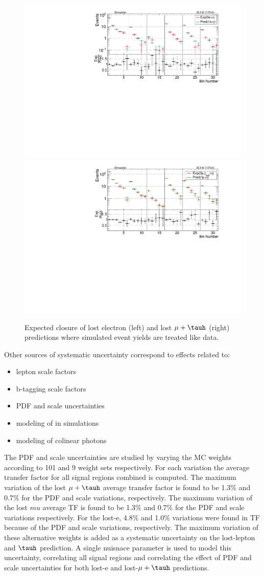 \begin{figure}
\centering
\includegraphics[width=0.48\linewidth]{../Figures/Chap3/SUSY_Photon_MET_JbJ_18Aug17/LostEle_Closure/AllSBins_v7_Ele0AllSBins_v7_Ele1.pdf}
\includegraphics[width=0.48\linewidth]{../Figures/Chap3/SUSY_Photon_MET_JbJ_18Aug17/LostMu_Closure/AllSBins_v7_Mu0AllSBins_v7_Mu1.pdf}
\captionsetup{width=.9\linewidth}
\caption[Closure for lost lepton and \tauh]{Expected closure of lost electron (left) and lost $\mu+\tauh$ (right) predictions
where simulated event yields are treated like data.}
\label{fig:lost_lepton_closure}
\end{figure}

Other sources of systematic uncertainty correspond to effects related to:
\begin{itemize}
  \item lepton scale factors
  \item b-tagging scale factors
  \item PDF and scale uncertainties
  \item modeling of \mt in simulations
  \item modeling of colinear photons 
\end{itemize}

The PDF and scale uncertainties are studied by varying the MC weights according
to 101 and 9 weight sets respectively.  For each variation the average transfer factor for
all signal regions combined is computed.  
The maximum variation of the lost $\mu+\tauh$
average transfer factor is found to be 1.3\% and 0.7\% for the PDF and scale variations, 
respectively.  
The maximum variation of the lost $mu$ average TF is found to be 1.3\% and 0.7\% for the PDF and scale variations respectively.
For the lost-e, 4.8\% and 1.0\% variations were found in TF because of the PDF and scale variations, respectively.
The maximum variation of these alternative weights is added as a systematic 
uncertainty on the lost-lepton and $\tauh$ prediction. A single nuisnace parameter
is used to model this uncertainty, correlating all signal regions and correlating
the effect of PDF and scale uncertainties for both lost-e and lost-$\mu+\tauh$
predictions. 

